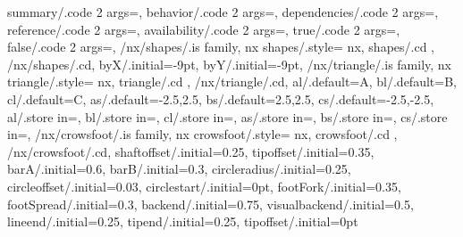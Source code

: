 {	summary/.code 2 args={\nxRocketInfoItem{}},%
	behavior/.code 2 args={\nxSearchInfoItem{}},%
	dependencies/.code 2 args={\nxLinkInfoItem{}},%
	reference/.code 2 args={\nxThumbTackDangerItem{}},%
	availability/.code 2 args={\nxBrainExperimentalItem{}},%
	true/.code 2 args={\nxCheckSuccessItem{}},%
	false/.code 2 args={\nxTimesDangerItem{}},%
	/nx/shapes/.is family,%
	nx shapes/.style={%
		nx, shapes/.cd%
	},%
	/nx/shapes/.cd,%
	byX/.initial=-9pt,%
	byY/.initial=-9pt,%
	/nx/triangle/.is family,%
	nx triangle/.style={%
		nx, triangle/.cd%
	},%
	/nx/triangle/.cd,%
	al/.default=A,%
	bl/.default=B,%
	cl/.default=C,%
	as/.default={-2.5,2.5},%
	bs/.default={2.5,2.5},%
	cs/.default={-2.5,-2.5},%
	al/.store in=\nx@AL,%
	bl/.store in=\nx@BL,%
	cl/.store in=\nx@CL,%
	as/.store in=\nx@AS,%
	bs/.store in=\nx@BS,%
	cs/.store in=\nx@CS,%
	/nx/crowsfoot/.is family,%
	nx crowsfoot/.style={%
		nx, crowsfoot/.cd%
	},%
	/nx/crowsfoot/.cd,%
	shaftoffset/.initial=0.25,%
	tipoffset/.initial=0.35,%
	barA/.initial=0.6,%
	barB/.initial=0.3,%
	circleradius/.initial=0.25,%
	circleoffset/.initial=0.03,%
	circlestart/.initial=0pt,%
	footFork/.initial=0.35,%
	footSpread/.initial=0.3,%
	backend/.initial=0.75,%
	visualbackend/.initial=0.5,%
	lineend/.initial=0.25,%
	tipend/.initial=0.25,%
	tipoffset/.initial=0pt%
}


